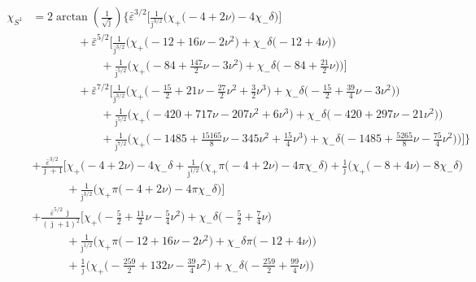 \documentclass[prd,superscriptaddress,preprintnumbers,tightenlines,nofootinbib, eqsecnum]{revtex4-2}
\newcommand{\nn}{\nonumber}
\begin{document}
\begin{align}
\chi_{S^1} &= 2\arctan\!\left(\frac{1}{\sqrt{\bar{\jmath}}}\right)\Bigg\{\bar{\varepsilon}^{3/2}\Bigg[
\frac{1}{\bar{\jmath}^{3/2}}\Bigg(\chi_{+}\bigg(-4 + 2 \nu\bigg) - 4\chi_{-}\delta\Bigg)\Bigg] \nn \\
&\qquad\qquad + \bar{\varepsilon}^{5/2}\Bigg[
\frac{1}{\bar{\jmath}^{3/2}}\Bigg(\chi_{+}\bigg(-12 + 16 \nu - 2 \nu^{2}\bigg) + \chi_{-}\delta\bigg(-12 + 4 \nu\bigg)\Bigg) \nn \\
&\qquad\qquad\qquad + \frac{1}{\bar{\jmath}^{5/2}}\Bigg(\chi_{+}\bigg(-84 + \frac{147}{2}\nu - 3 \nu^{2}\bigg) + \chi_{-}\delta\bigg(-84 + \frac{21}{2}\nu\bigg)\Bigg)\Bigg] \nn \\
&\qquad\qquad + \bar{\varepsilon}^{7/2}\Bigg[
\frac{1}{\bar{\jmath}^{3/2}}\Bigg(\chi_{+}\bigg(-\frac{15}{2} + 21 \nu - \frac{27}{2}\nu^{2} + \frac{3}{2}\nu^{3}\bigg) + \chi_{-}\delta\bigg(-\frac{15}{2} + \frac{39}{4}\nu - 3 \nu^{2}\bigg)\Bigg) \nn \\
&\qquad\qquad\qquad + \frac{1}{\bar{\jmath}^{5/2}}\Bigg(\chi_{+}\bigg(-420 + 717 \nu - 207 \nu^{2} + 6 \nu^{3}\bigg) + \chi_{-}\delta\bigg(-420 + 297 \nu - 21 \nu^{2}\bigg)\Bigg) \nn \\
&\qquad\qquad\qquad + \frac{1}{\bar{\jmath}^{7/2}}\Bigg(\chi_{+}\bigg(-1485 + \frac{15165}{8}\nu - 345 \nu^{2} + \frac{15}{4}\nu^{3}\bigg) + \chi_{-}\delta\bigg(-1485 + \frac{5265}{8}\nu - \frac{75}{4}\nu^{2}\bigg)\Bigg)\Bigg]\Bigg\} \nn \\
&+ \frac{\bar{\varepsilon}^{3/2}}{\bar{\jmath}+1}\Bigg[
\chi_{+}\bigg(-4 + 2 \nu\bigg) - 4\chi_{-}\delta + \frac{1}{\bar{\jmath}^{1/2}}\Bigg(\chi_{+}\pi\bigg(-4 + 2 \nu\bigg) - 4 \pi\chi_{-}\delta\Bigg) + \frac{1}{\bar{\jmath}}\Bigg(\chi_{+}\bigg(-8 + 4 \nu\bigg) - 8\chi_{-}\delta\Bigg) \nn \\
&\qquad\quad + \frac{1}{\bar{\jmath}^{3/2}}\Bigg(\chi_{+}\pi\bigg(-4 + 2 \nu\bigg) - 4 \pi\chi_{-}\delta\Bigg)\Bigg] \nn \\
&+ \frac{\bar{\varepsilon}^{5/2}\,\bar{\jmath}}{(\bar{\jmath}+1)^{2}}\Bigg[
\chi_{+}\bigg(-\frac{5}{2} + \frac{11}{2}\nu - \frac{5}{4}\nu^{2}\bigg) + \chi_{-}\delta\bigg(-\frac{5}{2} + \frac{7}{4}\nu\bigg) \nn \\
&\qquad\quad + \frac{1}{\bar{\jmath}^{1/2}}\Bigg(\chi_{+}\pi\bigg(-12 + 16 \nu - 2 \nu^{2}\bigg) + \chi_{-}\delta\pi\bigg(-12 + 4 \nu\bigg)\Bigg) \nn \\
&\qquad\quad + \frac{1}{\bar{\jmath}}\Bigg(\chi_{+}\bigg(-\frac{259}{2} + 132 \nu - \frac{39}{4}\nu^{2}\bigg) + \chi_{-}\delta\bigg(-\frac{259}{2} + \frac{99}{4}\nu\bigg)\Bigg) \nn \\

\end{align}
\end{document}
